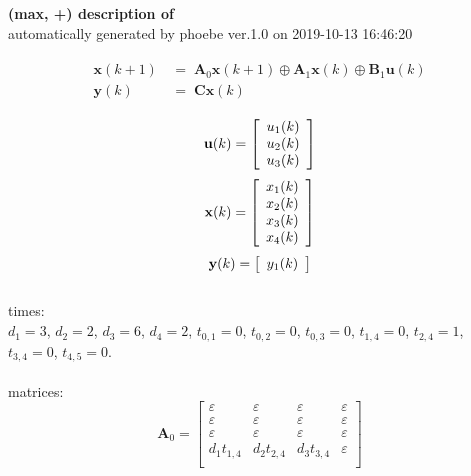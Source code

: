 \documentclass[11pt, a4paper, fleqn]{article}
\begin{document}
\noindent
\textbf{(max, +) description of} \texttt{\currfilebase} \\
automatically generated by phoebe ver.1.0 on 2019-10-13 16:46:20 

\begin{align}\begin{split}
\mathbf{x}(k+1) & \, = \; \mathbf{A}_{0}\mathbf{x}(k+1) \oplus \mathbf{A}_{1}\mathbf{x}(k) \oplus \mathbf{B}_{1}\mathbf{u}(k)\\
\mathbf{y}(k) & \, = \; \mathbf{Cx}(k)
\end{split}\end{align}

\begin{equation*}
\mathbf{u}(k) = 
\left[\begin{array}{*{20}c}
  u_1(k) \\
  u_2(k) \\
  u_3(k) \\
\end{array}\right]
\end{equation*}
\begin{equation*}
\mathbf{x}(k) = 
\left[\begin{array}{*{20}c}
  x_1(k) \\
  x_2(k) \\
  x_3(k) \\
  x_4(k) \\
\end{array}\right]
\end{equation*}
\begin{equation*}
\mathbf{y}(k) = 
\left[\begin{array}{*{20}c}
  y_1(k) \\
\end{array}\right]
\end{equation*}
\noindent\\
times:\\
$d_1 = 3$, $d_2 = 2$, $d_3 = 6$, $d_4 = 2$, $t_{0,1} = 0$, $t_{0,2} = 0$, $t_{0,3} = 0$, $t_{1,4} = 0$, $t_{2,4} = 1$, $t_{3,4} = 0$, $t_{4,5} = 0$.\\
\\
matrices:
\begin{equation*}
\mathbf{A}_{0} = 
\left[\begin{array}{ cccc }
\varepsilon	&\varepsilon	&\varepsilon	&\varepsilon\\
\varepsilon	&\varepsilon	&\varepsilon	&\varepsilon\\
\varepsilon	&\varepsilon	&\varepsilon	&\varepsilon\\
d_1t_{1,4}	&d_2t_{2,4}	&d_3t_{3,4}	&\varepsilon\\
\end{array}\right]
\end{equation*}
\end{document}
